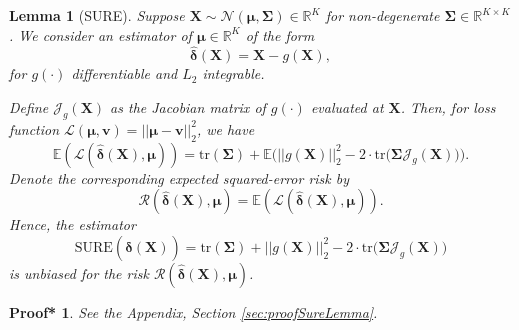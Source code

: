 \documentclass[10pt,a4paper]{amsart}
\newtheorem{lemma}{Lemma}
\newtheorem{proof*}{Proof*}
\newcommand{\Tr}{\text{tr}}
\newcommand{\bsSig}{\boldsymbol  \Sigma}
\newcommand{\bsSigma}{\boldsymbol \Sigma}
\newcommand{\bsX}{\boldsymbol X}
\newcommand{\bsdelt}{\boldsymbol{\hat \delta}}
\newcommand{\bsmu}{\boldsymbol \mu}
\def\e{\mathbb{E}}
\begin{document}
\begin{lemma}[SURE]\label{lemma:sure}
Suppose $\bsX \sim \mathcal{N}\left(\bsmu, \boldsymbol \Sigma\right) \in \mathbb{R}^K$ for non-degenerate $\bsSigma \in \mathbb{R}^{K \times K}$. We consider an estimator of $\bsmu \in \mathbb{R}^K$ of the form 
\[ \bsdelt(\bsX) = \bsX - g(\bsX), \]
for $g(\cdot)$ differentiable and $L_2$ integrable. 

Define $\mathcal{J}_{g}( \bsX )$ as the Jacobian matrix of $g(\cdot)$ evaluated at $\bsX$. Then, for loss function $\mathcal L(\bsmu, \boldsymbol v) =   || \bsmu - \boldsymbol v ||_2^2 $, we have 
\begin{equation}\label{eq:risk}
\e \left( \mathcal{L}\left( \bsdelt(\bsX), \bsmu \right) \right) = \Tr(\bsSigma ) + \e \bigg(|| g(\bsX)||_2^2 - 2 \cdot \Tr \big( \bsSig \mathcal{J}_{g}( \bsX )\big)  \bigg).
\end{equation}
Denote the corresponding expected squared-error risk by
\[ \mathcal{R}(\bsdelt(\bsX),\bsmu) = \e \left(\mathcal{L}(\bsdelt(\bsX),\bsmu)\right). \]
Hence, the estimator 
\begin{equation} \label{eq:SURE}
\text{SURE}(\bsdelt(\bsX)) = \Tr(\bsSigma ) + || g(\bsX)||_2^2 - 2 \cdot \Tr \big( \bsSig \mathcal{J}_{g}( \bsX )\big)
\end{equation} 
is unbiased for the risk $\mathcal{R} \left(\bsdelt(\bsX), \bsmu \right)$. 
\end{lemma}

\begin{proof*}
See the Appendix, Section \ref{sec:proofSureLemma}. 
\end{proof*}
\end{document}
